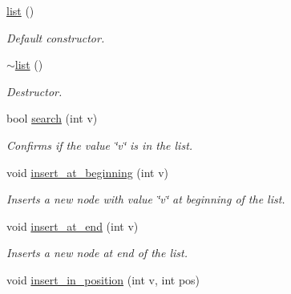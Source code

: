 \begin{DoxyCompactItemize}
\item 
\hypertarget{classlist_a223ecca7c96ef287c1e647493a32fbf6}{\hyperlink{classlist_a223ecca7c96ef287c1e647493a32fbf6}{list} ()}\label{classlist_a223ecca7c96ef287c1e647493a32fbf6}

\begin{DoxyCompactList}\small\item\em Default constructor. \end{DoxyCompactList}\item 
\hypertarget{classlist_a72eaabb03a048506432f8d167db12524}{\hyperlink{classlist_a72eaabb03a048506432f8d167db12524}{$\sim$list} ()}\label{classlist_a72eaabb03a048506432f8d167db12524}

\begin{DoxyCompactList}\small\item\em Destructor. \end{DoxyCompactList}\item 
\hypertarget{classlist_a7ad1d4788bef2d9ccb1827ed1576eb4e}{bool \hyperlink{classlist_a7ad1d4788bef2d9ccb1827ed1576eb4e}{search} (int v)}\label{classlist_a7ad1d4788bef2d9ccb1827ed1576eb4e}

\begin{DoxyCompactList}\small\item\em Confirms if the value \char`\"{}v\char`\"{} is in the list. \end{DoxyCompactList}\item 
\hypertarget{classlist_a69b02d50b1ec180ca86003eefc427bef}{void \hyperlink{classlist_a69b02d50b1ec180ca86003eefc427bef}{insert\-\_\-at\-\_\-beginning} (int v)}\label{classlist_a69b02d50b1ec180ca86003eefc427bef}

\begin{DoxyCompactList}\small\item\em Inserts a new node with value \char`\"{}v\char`\"{} at beginning of the list. \end{DoxyCompactList}\item 
\hypertarget{classlist_a0aa6499aab860dccd290638f1db18148}{void \hyperlink{classlist_a0aa6499aab860dccd290638f1db18148}{insert\-\_\-at\-\_\-end} (int v)}\label{classlist_a0aa6499aab860dccd290638f1db18148}

\begin{DoxyCompactList}\small\item\em Inserts a new node at end of the list. \end{DoxyCompactList}\item 
\hypertarget{classlist_ac6ae86ceba69b3d9930925e826533fe6}{void \hyperlink{classlist_ac6ae86ceba69b3d9930925e826533fe6}{insert\-\_\-in\-\_\-position} (int v, int pos)}\label{classlist_ac6ae86ceba69b3d9930925e826533fe6}


\end{DoxyCompactItemize}
